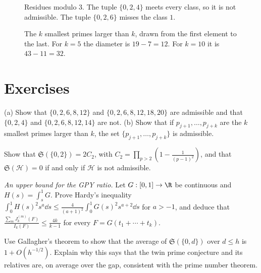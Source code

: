 \begin{figure}[ht]
\centering
{}
\caption{Residues modulo $3$. The tuple $\{0,2,4\}$ meets every class, so it is not admissible. The tuple $\{0,2,6\}$ misses the class $1$.}
\label{fig:v14-extra-08-a}
\end{figure}

\begin{figure}[ht]
\centering
{}
\caption{The $k$ smallest primes larger than $k$, drawn from the first element to the last. For $k=5$ the diameter is $19-7=12$. For $k=10$ it is $43-11=32$.}
\label{fig:v14-extra-08-b}
\end{figure}

\section{Exercises}

\begin{exercise}[$\star$]\label{ex:admiss}
(a) Show that $\{0,2,6,8,12\}$ and $\{0,2,6,8,12,18,20\}$ are admissible and that $\{0,2,4\}$ and $\{0,2,6,8,12,14\}$ are not.
(b) Show that if $p_{j+1},\dots,p_{j+k}$ are the $k$ smallest primes larger than $k$, the set $\{p_{j+1},\dots,p_{j+k}\}$ is admissible.
\end{exercise}

\begin{exercise}[$\star$]\label{ex:singtwin}
Show that $\mathfrak S(\{0,2\})=2C_2$, with $C_2=\prod_{p>2}(1-\frac1{(p-1)^2})$, and that $\mathfrak S(\mathcal H)=0$ if and only if $\mathcal H$ is not admissible.
\end{exercise}

\begin{exercise}[$\star\star$]\label{ex:hardyineq}
\emph{An upper bound for the GPY ratio.} Let $G:[0,1]\to\R$ be continuous and $H(s)=\int_s^1G$. Prove Hardy's inequality $\int_0^1H(s)^2s^{a}\dd s\le\frac4{(a+1)^2}\int_0^1G(s)^2s^{a+2}\dd s$ for $a>-1$, and deduce that $\frac{\sum_mJ^{(m)}_k(F)}{I_k(F)}\le\frac{4k}{k-1}$ for every $F=G(t_1+\cdots+t_k)$.
\end{exercise}

\begin{exercise}[$\star\star$]\label{ex:gallaghertuple}
Use Gallagher's theorem to show that the average of $\mathfrak S(\{0,d\})$ over $d\le h$ is $1+O(h^{-1/2})$. Explain why this says that the twin prime conjecture and its relatives are, on average over the gap, consistent with the prime number theorem.
\end{exercise}

